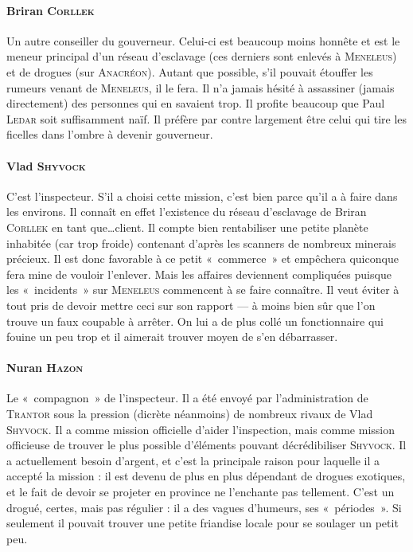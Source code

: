 \documentclass{article}
\begin{document}
{\paragraph{Briran \textsc{Corllek}}
{
Un autre conseiller du gouverneur.
Celui-ci est beaucoup moins honnête et est le meneur principal d’un réseau d’esclavage (ces derniers sont enlevés à \textsc{Meneleus}) et de drogues (sur \textsc{Anacréon}).
Autant que possible, s’il pouvait étouffer les rumeurs venant de \textsc{Meneleus}, il le fera.
Il n’a jamais hésité à assassiner (jamais directement) des personnes qui en savaient trop.
Il profite beaucoup que Paul \textsc{Ledar} soit suffisamment naïf.
Il préfère par contre largement être celui qui tire les ficelles dans l’ombre à devenir gouverneur.
}

\paragraph{Vlad \textsc{Shyvock}}
{
C’est l'inspecteur.
S’il a choisi cette mission, c’est bien parce qu’il a à faire dans les environs.
Il connaît en effet l’existence du réseau d’esclavage de Briran \textsc{Corllek} en tant que\ldots client.
Il compte bien rentabiliser une petite planète inhabitée (car trop froide) contenant d’après les scanners de nombreux minerais précieux.
Il est donc favorable à ce petit «~commerce~» et empêchera quiconque fera mine de vouloir l’enlever.
Mais les affaires deviennent compliquées puisque les «~incidents~» sur \textsc{Meneleus} commencent à se faire connaître.
Il veut éviter à tout pris de devoir mettre ceci sur son rapport — à moins bien sûr que l’on trouve un faux coupable à arrêter.
On lui a de plus collé un fonctionnaire qui fouine un peu trop et il aimerait trouver moyen de s’en débarrasser.
}

\paragraph{Nuran \textsc{Hazon}}
{
Le «~compagnon~» de l’inspecteur.
Il a été envoyé par l’administration de \textsc{Trantor} sous la pression (dicrète néanmoins) de nombreux rivaux de Vlad \textsc{Shyvock}.
Il a comme mission officielle d’aider l’inspection, mais comme mission officieuse de trouver le plus possible d’éléments pouvant décrédibiliser \textsc{Shyvock}.
Il a actuellement besoin d’argent, et c’est la principale raison pour laquelle il a accepté la mission : il est devenu de plus en plus dépendant de drogues exotiques, et le fait de devoir se projeter en province ne l’enchante pas tellement. C’est un drogué, certes, mais pas régulier : il a des vagues d’humeurs, ses «~périodes~».
Si seulement il pouvait trouver une petite friandise locale pour se soulager un petit peu.
}

}
\end{document}
